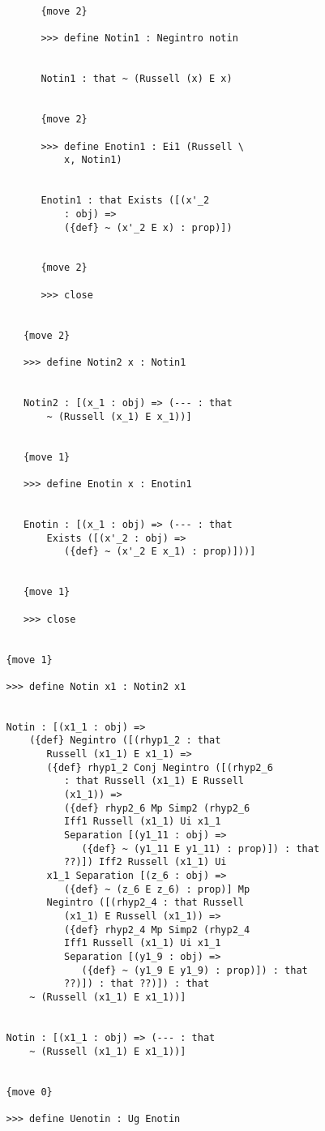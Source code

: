 \documentclass[12pt]{article}
\begin{document}
\begin{verbatim}
         {move 2}

         >>> define Notin1 : Negintro notin


         Notin1 : that ~ (Russell (x) E x)


         {move 2}

         >>> define Enotin1 : Ei1 (Russell \
             x, Notin1)


         Enotin1 : that Exists ([(x'_2 
             : obj) => 
             ({def} ~ (x'_2 E x) : prop)])


         {move 2}

         >>> close


      {move 2}

      >>> define Notin2 x : Notin1


      Notin2 : [(x_1 : obj) => (--- : that 
          ~ (Russell (x_1) E x_1))]


      {move 1}

      >>> define Enotin x : Enotin1


      Enotin : [(x_1 : obj) => (--- : that 
          Exists ([(x'_2 : obj) => 
             ({def} ~ (x'_2 E x_1) : prop)]))]


      {move 1}

      >>> close


   {move 1}

   >>> define Notin x1 : Notin2 x1


   Notin : [(x1_1 : obj) => 
       ({def} Negintro ([(rhyp1_2 : that 
          Russell (x1_1) E x1_1) => 
          ({def} rhyp1_2 Conj Negintro ([(rhyp2_6 
             : that Russell (x1_1) E Russell 
             (x1_1)) => 
             ({def} rhyp2_6 Mp Simp2 (rhyp2_6 
             Iff1 Russell (x1_1) Ui x1_1 
             Separation [(y1_11 : obj) => 
                ({def} ~ (y1_11 E y1_11) : prop)]) : that 
             ??)]) Iff2 Russell (x1_1) Ui 
          x1_1 Separation [(z_6 : obj) => 
             ({def} ~ (z_6 E z_6) : prop)] Mp 
          Negintro ([(rhyp2_4 : that Russell 
             (x1_1) E Russell (x1_1)) => 
             ({def} rhyp2_4 Mp Simp2 (rhyp2_4 
             Iff1 Russell (x1_1) Ui x1_1 
             Separation [(y1_9 : obj) => 
                ({def} ~ (y1_9 E y1_9) : prop)]) : that 
             ??)]) : that ??)]) : that 
       ~ (Russell (x1_1) E x1_1))]


   Notin : [(x1_1 : obj) => (--- : that 
       ~ (Russell (x1_1) E x1_1))]


   {move 0}

   >>> define Uenotin : Ug Enotin



\end{verbatim}
\end{document}
